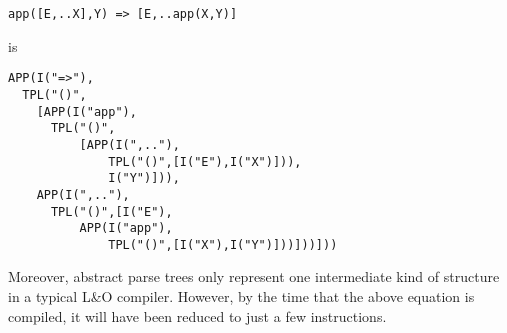 \begin{verbatim}
app([E,..X],Y) => [E,..app(X,Y)]
\end{verbatim}
is
\begin{verbatim}
APP(I("=>"),
  TPL("()",
    [APP(I("app"),
      TPL("()",
          [APP(I(",.."),
              TPL("()",[I("E"),I("X")])),
              I("Y")])),
    APP(I(",.."),
      TPL("()",[I("E"),
          APP(I("app"),
              TPL("()",[I("X"),I("Y")]))]))]))
\end{verbatim}
Moreover, abstract parse trees only represent one intermediate kind of structure in a typical L&O compiler. However, by the time that the above equation is compiled, it will have been reduced to just a few instructions.
